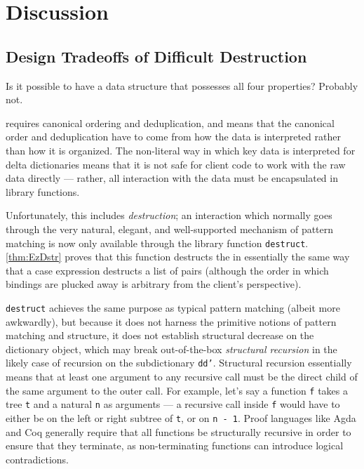 \section{Discussion}
\label{sec:Discussion}

\subsection{Design Tradeoffs of Difficult Destruction}
\label{sec:Discussion:Tradeoffs}

Is it possible to have a data structure that possesses all four properties?
%
Probably not.

\SemInj{} requires canonical ordering and deduplication, and \SemTot{} means that the canonical order and deduplication have to come from how the data is interpreted rather than how it is organized.
%
%
The non-literal way in which key data is interpreted for delta dictionaries means that it is not safe for client code to work with the raw data directly --- rather, all interaction with the data must be encapsulated in library functions.

Unfortunately, this includes \emph{destruction}; an interaction which
normally goes through the very natural, elegant, and well-supported mechanism of pattern matching is now
only available through the library function \verb+destruct+. \autoref{thm:EzDstr} proves that this function
destructs the \dd{} in essentially the same way that a case expression destructs a list of pairs (although
the order in which bindings are plucked away is arbitrary from the client's perspective).

\verb+destruct+ achieves the same purpose as typical pattern matching (albeit more awkwardly), but because it
does not harness the primitive notions of pattern matching and structure, it does not establish structural
decrease on the dictionary object, which may break out-of-the-box \emph{structural recursion} in the likely case
of recursion on the subdictionary \texttt{dd'}.
Structural recursion essentially means that at least one argument to any recursive call must be the direct child of the same argument to the outer call.
For example, let's say a function \texttt{f} takes a tree \texttt{t} and a natural \texttt{n} as arguments ---
a recursive call inside \texttt{f} would have to either be on the left or right subtree of \texttt{t}, or on \texttt{n - 1}.
Proof languages like Agda and Coq generally require that all functions be structurally recursive in order to ensure that they terminate,
as non-terminating functions can introduce logical contradictions.

